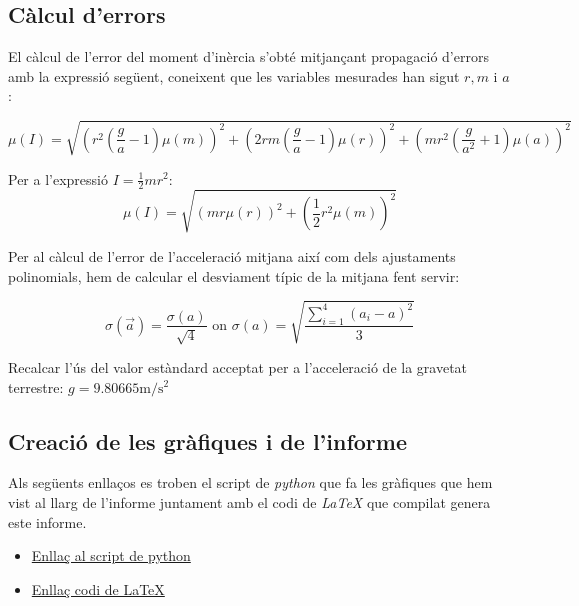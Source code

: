 \documentclass[11pt]{article}
\begin{document}
    \subsection{Càlcul d'errors}\label{appendix:errors}
        El càlcul de l'error del moment d'inèrcia s'obté mitjançant propagació d'errors amb la expressió següent, coneixent que les variables mesurades han sigut $r,m$ i $a$:

        $$\mu\left(I\right)=\sqrt{\left(r^2\left(\frac{g}{a}-1\right)\mu\left(m\right)\right)^2+\left(2rm\left(\frac{g}{a}-1\right)\mu\left(r\right)\right)^2+\left(mr^2\left(\frac{g}{a^2}+1\right)\mu\left(a\right)\right)^2}$$

        \vspace{0.5cm}Per a l'expressió $I=\frac12mr^2$:
        \vspace{-0.3cm}$$\mu\left(I\right)=\sqrt{\left(mr\mu\left(r\right)\right)^2+\left(\frac12r^2\mu\left(m\right)\right)^2}$$

        Per al càlcul de l'error de l'acceleració mitjana així com dels ajustaments polinomials, hem de calcular el desviament típic de la mitjana fent servir:

        \vspace{-0.2cm}
        $$\sigma\left(\vec{a}\right)=\frac{\sigma\left(a\right)}{\sqrt{4}}\text{  on  }\sigma\left(a\right)=\sqrt{\frac{\sum\limits_{i=1}^4\left(a_i-a\right)^2}{3}}$$

        \vspace{0.4cm}Recalcar l'ús del valor estàndard acceptat per a l'acceleració de la gravetat terrestre: $g=9.80665\si{\meter}/\si{\second}^2$
        
    \clearpage
    \subsection{Creació de les gràfiques i de l'informe}\label{appendix:codigo}
        Als següents enllaços es troben el script de \textit{python} que fa les gràfiques que hem vist al llarg de l'informe juntament amb el codi de \textit{LaTeX} que compilat genera este informe.
        \begin{itemize}
            \item \href{https://github.com/vmr48-ua/extras/blob/main/TEC1-MyO1.py}{Enllaç al script de python}
            \item \href{https://www.overleaf.com/read/jpfznpdgtrfc}{Enllaç codi de LaTeX}
        \end{itemize}
    
\end{document}
